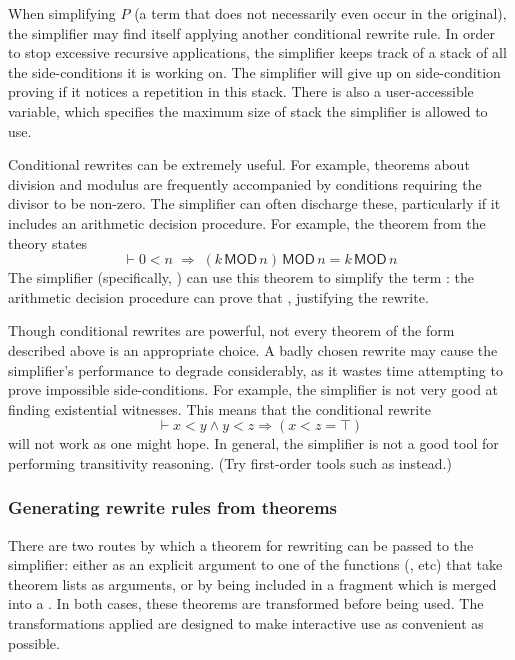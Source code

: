 {When simplifying $P$ (a term that does not necessarily even occur in
the original), the simplifier may find itself applying another
conditional rewrite rule.  In order to stop excessive recursive
applications, the simplifier keeps track of a stack of all the
side-conditions it is working on.  The simplifier will give up on
side-condition proving if it notices a repetition in this stack.
There is also a user-accessible variable, 
which specifies the maximum size of stack the simplifier is allowed to
use.

Conditional rewrites can be extremely useful.  For example, theorems
about division and modulus are frequently accompanied by conditions
requiring the divisor to be non-zero.  The simplifier can often
discharge these, particularly if it includes an arithmetic decision
procedure.  For example, the theorem  from the theory
 states
\[
\vdash 0 < n \;\Rightarrow \; (k\,\textsf{MOD}\,n)\,\textsf{MOD}\,n = k
\,\textsf{MOD}\,n
\]
The simplifier (specifically, )
can use this theorem to simplify the term
: the arithmetic decision
procedure can prove that , justifying the rewrite.

Though conditional rewrites are powerful, not every theorem of the
form described above is an appropriate choice.  A badly chosen rewrite
may cause the simplifier's performance to degrade considerably, as it
wastes time attempting to prove impossible side-conditions.  For
example, the simplifier is not very good at finding existential
witnesses.  This means that the conditional rewrite \[
\vdash x < y \land y < z \Rightarrow (x < z = \top)
\]
will not work as one might hope.  In general, the simplifier is not a
good tool for performing transitivity reasoning.  (Try first-order
tools such as  instead.)

\subsubsection{Generating rewrite rules from theorems}
\label{sec:generating-rewrite-rules}

There are two routes by which a theorem for rewriting can be passed to
the simplifier: either as an explicit argument to one of the \ML{}
functions (,  etc) that take theorem
lists as arguments, or by being included in a \simpset{} fragment
which is merged into a \simpset.  In both cases, these theorems are
transformed before being used.  The transformations applied are
designed to make interactive use as convenient as possible.

}
